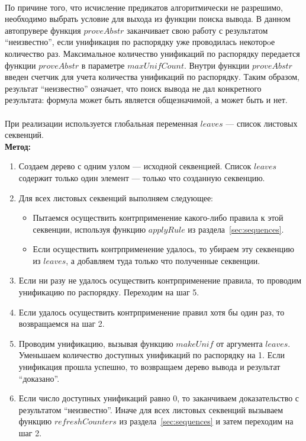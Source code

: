 \documentclass{cw1}
\begin{document}
\paragraph{}
По причине того, что исчисление предикатов алгоритмически не разрешимо, необходимо выбрать условие
для выхода из функции поиска вывода. В данном автопрувере функция $proveAbstr$ заканчивает свою работу
с результатом ``неизвестно'', если унификация по распорядку уже проводилась некоторoе количество
раз. Максимальное количество унификаций по распорядку передается функции $proveAbstr$ в параметре
$maxU\!nif\!Count$. Внутри функции $proveAbstr$ введен счетчик для учета количества унификаций
по распорядку. Таким образом, результат ``неизвестно'' означает,
что поиск вывода не дал конкретного результата: формула может быть является общезначимой, а может
быть и нет.
\paragraph{}
При реализации используется глобальная переменная $leaves$ --- список листовых секвенций.\\
\textbf{Метод:}
\begin{enumerate}
 \item Создаем дерево с одним узлом --- исходной секвенцией. Список $leaves$ содержит
 только один элемент --- только что созданную секвенцию.
 \item Для всех листовых секвенций выполняем следующее:
 \begin{itemize}
  \item Пытаемся осуществить контрприменение какого-либо правила к этой секвенции,
  используя функцию $applyRule$ из раздела~\ref{sec:sequences}.
  \item Если осуществить контрприменение удалось, то убираем эту секвенцию из $leaves$, а добавляем туда
  только что полученные секвенции.
 \end{itemize}
 \item Если ни разу не удалось осуществить контрприменение правила, то проводим
 унификацию по распорядку.  Переходим на шаг 5.
 \item Если удалось осуществить контрприменение
 правил хотя бы один раз, то возвращаемся на шаг 2.
 \item Проводим унификацию, вызывая функцию $makeU\!ni\!f$ от аргумента $leaves$.
 Уменьшаем количество доступных унификаций по распорядку на 1.
 Если унификация прошла успешно, то возвращаем дерево вывода и результат ``доказано''.
 \item Если число доступных унификаций равно 0, то заканчиваем доказательство с результатом
 ``неизвестно''. Иначе для всех листовых секвенций вызываем функцию
$refreshCounters$ из раздела~\ref{sec:sequences} и затем переходим на шаг 2.
\end{enumerate}
\end{document}
